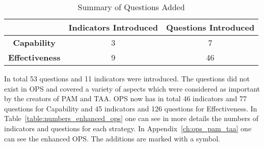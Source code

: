 \begin{table} [H]
	\caption{Summary of Questions Added}
	\label{table:summary_questions_added}
	\begin{tabular}{| c | c | c |} \hline
		 & \textbf{Indicators Introduced} & \textbf{Questions Introduced} \\ \hline
		 \textbf{Capability} & 3 & 7 \\ \hline
		 \textbf{Effectiveness} & 9 & 46 \\ \hline
	\end{tabular}
\end{table}

In total 53 questions and 11 indicators were introduced. The questions did not exist in OPS and covered a variety of aspects which were considered as important by the creators of PAM and TAA. OPS now has in total 46 indicators and 77 questions for Capability and 45 indicators and 126 questions for Effectiveness. In Table~\ref{table:numbers_enhanced_ops} one can see in more details the numbers of indicators and questions for each strategy. In Appendix~\ref{ch:ops_pam_taa} one can see the enhanced OPS. The additions are marked with a \FiveStar  symbol.


